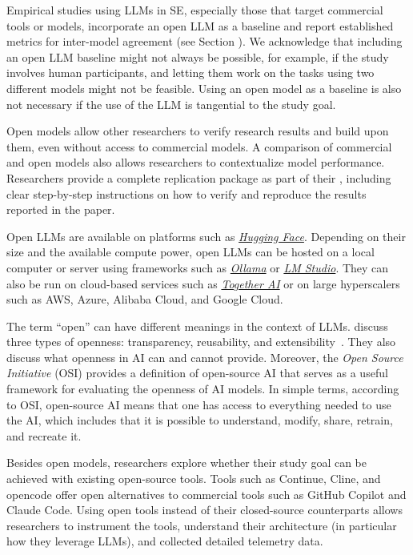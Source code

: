 
Empirical studies using LLMs in SE, especially those that target commercial tools or models, \should incorporate an open LLM as a baseline and report established metrics for inter-model agreement (see Section \benchmarksmetrics).
We acknowledge that including an open LLM baseline might not always be possible, for example, if the study involves human participants, and letting them work on the tasks using two different models might not be feasible.
Using an open model as a baseline is also not necessary if the use of the LLM is tangential to the study goal. %

Open models allow other researchers to verify research results and build upon them, even without access to commercial models.
A comparison of commercial and open models also allows researchers to contextualize model performance.
Researchers \should provide a complete replication package as part of their \supplementarymaterial, including clear step-by-step instructions on how to verify and reproduce the results reported in the paper.

Open LLMs are available on platforms such as \href{https://huggingface.co/}{\emph{Hugging Face}}.
Depending on their size and the available compute power, open LLMs can be hosted on a local computer or server using frameworks such as \href{https://ollama.com/}{\emph{Ollama}} or \href{https://lmstudio.ai/}{\emph{LM Studio}}.
They can also be run on cloud-based services such as \href{https://together.ai/}{\emph{Together AI}} or on large hyperscalers such as AWS, Azure, Alibaba Cloud, and Google Cloud.

The term ``open'' can have different meanings in the context of LLMs.
\citeauthor{widder2024open} discuss three types of openness: transparency, reusability, and extensibility~\cite{widder2024open}.
They also discuss what openness in AI can and cannot provide.
Moreover, the \emph{Open Source Initiative} (OSI) \cite{OSIAI2024} provides a definition of open-source AI that serves as a useful framework for evaluating the openness of AI models.
In simple terms, according to OSI, open-source AI means that one has access to everything needed to use the AI, which includes that it is possible to understand, modify, share, retrain, and recreate it.

Besides open models, researchers \may explore whether their study goal can be achieved with existing open-source tools.
Tools such as Continue, Cline, and opencode offer open alternatives to commercial tools such as GitHub Copilot and Claude Code.
Using open tools instead of their closed-source counterparts allows researchers to instrument the tools, understand their architecture (in particular how they leverage LLMs), and collected detailed telemetry data.

